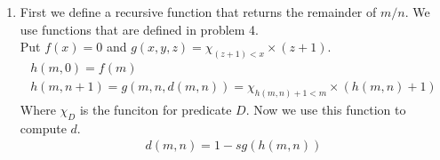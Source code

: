\begin{enumerate}[label=]
    \item 
        First we define a recursive function that returns the remainder of $m/n$.
        We use functions that are defined in problem 4.\\
        Put $f(x) = 0$ and $g(x, y, z) = \chi_{(z + 1)<x} \times (z + 1)$.
        \begin{gather*}
            h(m, 0) = f(m) \\
            h(m, n + 1) = g(m, n, d(m, n)) = \chi_{h(m, n) + 1 < m} \times (h(m, n) + 1)
        \end{gather*}
        Where $\chi_D$ is the funciton for predicate $D$.
        Now we use this function to compute $d$.
        \begin{gather*}
            d(m, n) = 1 - sg(h(m, n))
        \end{gather*}
\end{enumerate}